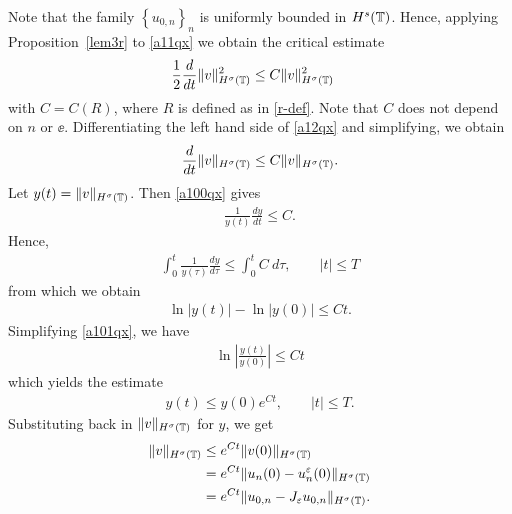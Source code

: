 Note that the family $\left\{ u_{0,n} \right\}_n$ is uniformly bounded in
$H^s(\mathbb{T})$. Hence, applying Proposition~\ref{lem3r} to \eqref{a11qx} we obtain the critical estimate 
\begin{equation}
\begin{split}
\label{a12qx}
\frac{1}{2}\frac{d}{dt} \|v\|_{H^{\sigma}(\mathbb{T})}^2
& \le
C \|v\|_{H^{\sigma}(\mathbb{T})}^2
\end{split}
\end{equation}
with $C = C(R)$, where $R$ is defined as in \eqref{r-def}. Note that $C$
does not depend on $n$ or $\ee$. Differentiating
the left hand side of \eqref{a12qx} and simplifying, we obtain
\begin{equation}
\begin{split}
\frac{d}{dt}\|v\|_{H^{\sigma}(\mathbb{T})} \le C \|v\|_{H^{\sigma}(\mathbb{T})}.
\label{a100qx}
\end{split}
\end{equation}
Let $y(t) = \|v\|_{H^{\sigma}(\mathbb{T})}$. Then \eqref{a100qx} gives
\begin{equation*}
\begin{split}
\frac{1}{y(t)}\frac{dy}{dt} \le C.
\end{split}
\end{equation*}
Hence,
\begin{equation*}
\begin{split}
\int_0^t \frac{1}{y(\tau)} \frac{dy}{d \tau}
\le \int_0^t C \ d \tau, \qquad |t| \le T
\end{split}
\end{equation*}
from which we obtain
\begin{equation}
\begin{split}
\ln |y(t) | - \ln |y(0)| \le C t.
\label{a101qx}
\end{split}
\end{equation}
Simplifying \eqref{a101qx}, we have
\begin{equation*}
\begin{split}
\ln \left |\frac{y(t)}{y(0)} \right | \le C t
\end{split}
\end{equation*}
which yields the estimate
\begin{equation*}
\begin{split}
y(t) \le y(0) e^{C t}, \qquad |t| \le T.
\end{split}
\end{equation*}
Substituting back in $\|v\|_{H^{\sigma}(\mathbb{T})}$ for $y$, we get
\begin{equation}
\label{vsig-est}
\begin{split}
\|v\|_{H^{\sigma}(\mathbb{T})}
& \le e^{C t}\|v(0)\|_{H^{\sigma}(\mathbb{T})}
\\
& = e^{C t}\|u_n(0) - u^\varepsilon_n(0) \|_{H^{\sigma}(\mathbb{T})}
\\
& = e^{C t}\|u_{0,n} - J_\varepsilon u_{0,n}\|_{H^{\sigma}(\mathbb{T})}.
\end{split}
\end{equation}
